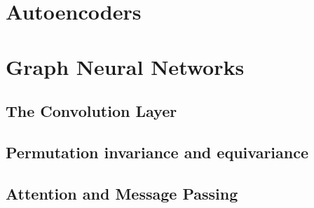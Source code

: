 \section{Autoencoders}





\section{Graph Neural Networks}
\subsection{The Convolution Layer}
\subsection{Permutation invariance and equivariance}
\subsection{Attention and Message Passing}

